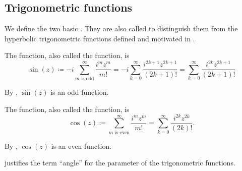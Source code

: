 \subsection{Trigonometric functions}\label{subsec:trigonometric_functions}

\begin{definition}\label{def:trigonometric_functions}
  We define the two basic . They are also called  to distinguish them from the hyperbolic trigonometric functions defined and motivated in .

  \begin{defenum}
     The  function, also called the  function, is
    \begin{equation*}
      \sin(z)
      \coloneqq
      -i \sum_{m \text{ is odd}}^\infty \frac {i^m z^m} {m!}
      =
      -i \sum_{k=0}^\infty \frac {i^{2k+1} z^{2k+1}} {(2k + 1)!}
      =
      \sum_{k=0}^\infty \frac {i^{2k} z^{2k+1}} {(2k + 1)!}
    \end{equation*}

    By , \( \sin(z) \) is an odd function.

     The  function, also called the  function, is
    \begin{equation*}
      \cos(z)
      \coloneqq
      \sum_{m \text{ is even}}^\infty \frac {i^m z^m} {m!}
      =
      \sum_{k=0}^\infty \frac {i^{2k} z^{2k}} {(2k)!}.
    \end{equation*}

    By , \( \cos(z) \) is an even function.
  \end{defenum}

   justifies the term \enquote{angle} for the parameter of the trigonometric functions.
\end{definition}

